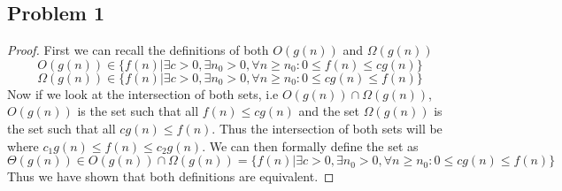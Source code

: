 \documentclass[12pt]{article}
\begin{document}
\subsection*{Problem 1}
\begin{proof}
First we can recall the definitions of both $O(g(n))$ and $\Omega(g(n))$
\[ O(g(n)) \in \{ f(n)|\exists c>0, \exists n_0>0, \forall n \geq n_0: 0 \leq f(n) \leq cg(n) \} \]
\[ \Omega (g(n)) \in \{ f(n)|\exists c>0, \exists n_0>0, \forall n \geq n_0: 0 \leq cg(n) \leq f(n) \} \]
Now if we look at the intersection of both sets, i.e $O(g(n)) \cap \Omega(g(n))$, $O(g(n))$ is the set such that all $f(n) \leq cg(n)$ and the set $\Omega(g(n))$ is the set such that all $cg(n) \leq f(n)$. Thus the intersection of both sets will be where $c_1g(n) \leq f(n) \leq c_2g(n)$. We can then formally define the set as 
\[ \Theta(g(n)) \in O(g(n)) \cap \Omega(g(n)) = \{ f(n)|\exists c>0, \exists n_0>0, \forall n \geq n_0: 0 \leq cg(n) \leq f(n) \} \]
Thus we have shown that both definitions are equivalent.
\end{proof}
\end{document}
